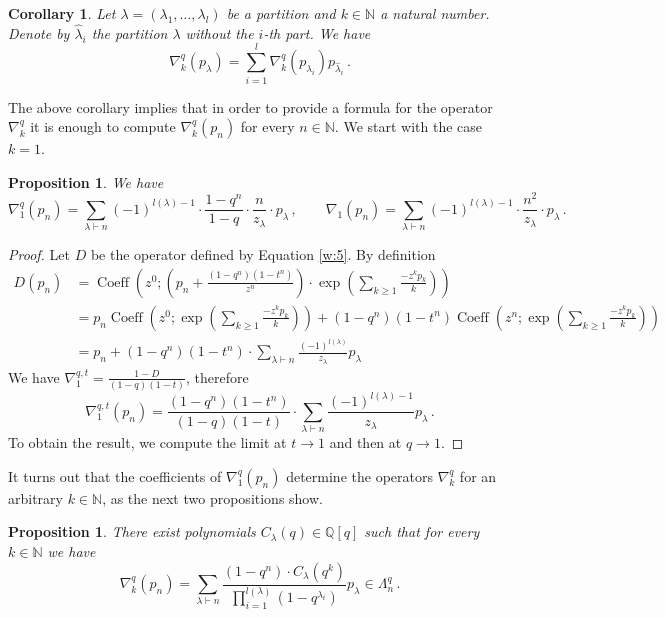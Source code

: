 \documentclass[12pt,a4paper]{amsart}
\theoremstyle{plain}
\newtheorem{pro}[tw]{Proposition}
\newtheorem{cor}[tw]{Corollary}
\theoremstyle{definition}
\theoremstyle{remark}
\newcommand{\NN}{\mathbb{N}}
\newcommand{\QQ}{\mathbb{Q}}
\newcommand\znak[1]{(-1)^{l({#1})-1}}
\begin{document}
\begin{cor} \label{cor:split}
	Let $\lambda=(\lambda_1,\dots,\lambda_l)$ be a partition and $k\in \NN$ a natural number. 
	Denote by $\widehat{\lambda}_i$ the partition $\lambda$ without the $i$-th part. We have
		$$\nabla^q_k(p_\lambda)=\sum_{i=1}^{l} \nabla^q_k(p_{\lambda_i})p_{\widehat{\lambda}_i}\,. $$
\end{cor}
The above corollary implies that in order to provide a formula for the operator $\nabla^q_k$ it is enough to compute  $\nabla^q_k(p_n)$ for every $n\in \NN$. We start with the case $k=1$.
\begin{pro}\label{pro:k=1}
	We have
	$$\nabla^q_1(p_n)=\sum_{\lambda\vdash n}\znak{\lambda}\cdot \frac{1-q^n}{1-q}\cdot\frac{n}{z_\lambda}\cdot p_{\lambda}\,,\qquad \nabla_1(p_n)=\sum_{\lambda\vdash n}\znak{\lambda} \cdot \frac{n^2}{z_\lambda}\cdot p_{\lambda}\,.$$
\end{pro}
\begin{proof}
Let $D$ be the operator defined by Equation \eqref{w:5}.  By definition
\begin{align*}
	D(p_n)&=
	\operatorname{Coeff} \left(z^0; \left(p_n+\frac{(1-q^n)(1-t^n)}{z^n}\right)\cdot \exp\left(\sum_{k\ge 1}\frac{-z^kp_k}{k} \right)\right) \\
	&=p_n\operatorname{Coeff} \left(z^0;\exp\left(\sum_{k\ge 1}\frac{-z^kp_k}{k} \right)\right)+ (1-q^n)(1-t^n)\operatorname{Coeff} \left(z^n;\exp\left(\sum_{k\ge 1}\frac{-z^kp_k}{k} \right)\right) \\
	&=p_n + (1-q^n)(1-t^n)\cdot\sum_{\lambda\vdash n}\frac{(-1)^{l(\lambda)}}{z_\lambda}p_\lambda
\end{align*}
We have $\nabla_1^{q,t}=\frac{1-D}{(1-q)(1-t)}$, therefore
$$\nabla_1^{q,t}(p_n)= \frac{(1-q^n)(1-t^n)}{(1-q)(1-t)}\cdot\sum_{\lambda\vdash n} \frac{\znak{\lambda}}{z_\lambda} p_\lambda \,.$$
To obtain the result, we compute the limit at $t\to 1$ and then at $q\to 1$.
\end{proof}
\noindent It turns out that the coefficients of $\nabla^q_1(p_n)$ determine the operators $\nabla^q_k$ for an arbitrary $k\in\NN$, as the next two propositions show.
\begin{pro} \label{pro:poly}
	There exist polynomials $C_\lambda(q)\in\QQ[q]$ such that for every $k\in \NN$ we have
	$$\nabla^q_k(p_n)=\sum_{\lambda\vdash n}\frac{(1-q^n)\cdot C_\lambda(q^k)}{\prod_{i=1}^{l(\lambda)}(1-q^{\lambda_i})}p_\lambda \in \Lambda^q_n\,.  $$
\end{pro}
\end{document}
